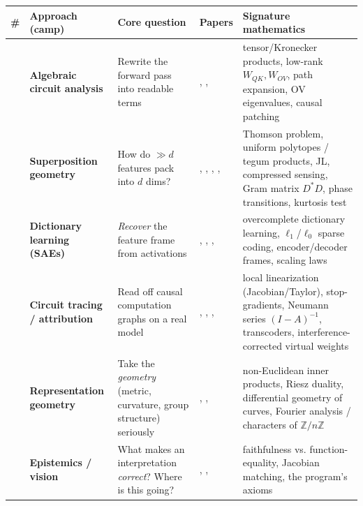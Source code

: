 \begingroup\footnotesize\noindent
\begin{tabular}{>{\raggedright\arraybackslash}p{}>{\raggedright\arraybackslash}p{}>{\raggedright\arraybackslash}p{}>{\raggedright\arraybackslash}p{}>{\raggedright\arraybackslash}p{}}
\toprule
\# & Approach (camp) & Core question & Papers & Signature mathematics \\
\midrule
1 & \textbf{Algebraic circuit analysis} & Rewrite the forward pass into readable terms & \textcite{framework}, \textcite{induction-heads}, \textcite{interpretability-in-the-wild-ioi} & tensor/Kronecker products, low-rank $W_{QK},W_{OV}$, path expansion, OV eigenvalues, causal patching \\
2 & \textbf{Superposition geometry} & How do $\gg d$ features pack into $d$ dims? & \textcite{toy-models-superposition}, \textcite{superposition-memorization-double-descent}, \textcite{distributed-representations-composition-superposition}, \textcite{privileged-bases-residual-stream}, \textcite{toy-model-of-interference-weights} & Thomson problem, uniform polytopes / tegum products, JL, compressed sensing, Gram matrix $D^{*}D$, phase transitions, kurtosis test \\
3 & \textbf{Dictionary learning (SAEs)} & \emph{Recover} the feature frame from activations & \textcite{towards-monosemanticity}, \textcite{scaling-monosemanticity}, \textcite{softmax-linear-units}, \textcite{sparse-crosscoders-model-diffing} & overcomplete dictionary learning, $\ell_1$/$\ell_0$ sparse coding, encoder/decoder frames, scaling laws \\
4 & \textbf{Circuit tracing / attribution} & Read off causal computation graphs on a real model & \textcite{circuit-tracing-computational-graphs}, \textcite{on-the-biology-of-a-large-language-model}, \textcite{tracing-attention-feature-interactions}, \textcite{progress-on-attention} & local linearization (Jacobian/Taylor), stop-gradients, Neumann series $(I-A)^{-1}$, transcoders, interference-corrected virtual weights \\
5 & \textbf{Representation geometry} & Take the \emph{geometry} (metric, curvature, group structure) seriously & \textcite{linear-representation-hypothesis-geometry}, \textcite{when-models-manipulate-manifolds-counting}, \textcite{progress-measures-for-grokking} & non-Euclidean inner products, Riesz duality, differential geometry of curves, Fourier analysis / characters of $\mathbb{Z}/n\mathbb{Z}$ \\
6 & \textbf{Epistemics / vision} & What makes an interpretation \emph{correct}? Where is this going? & \textcite{interpretability-dreams}, \textcite{toy-model-of-mechanistic-unfaithfulness}, \textcite{mech-interp-variables-bases} & faithfulness vs. function-equality, Jacobian matching, the program's axioms \\
\bottomrule
\end{tabular}
\endgroup


